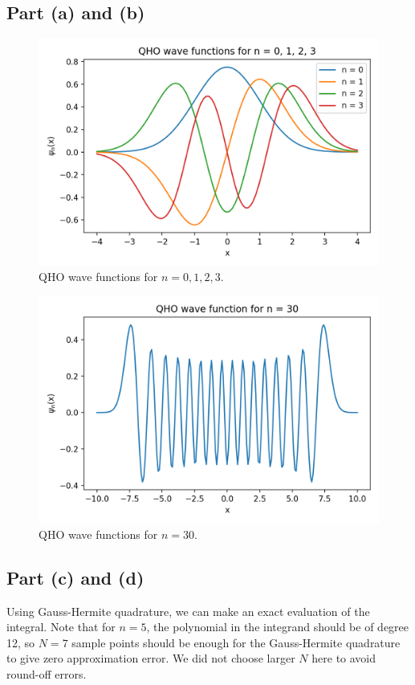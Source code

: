 \documentclass[11pt]{article}
\begin{document}
\subsection{Part (a) and (b)}
\begin{figure}[H]
    \centering
    \includegraphics[scale = 1.0]{images/ps-4-3a.png}
    \caption{QHO wave functions for $n = 0, 1, 2, 3$.}
    \label{fig:QHO0123}
\end{figure}
\begin{figure}[H]
    \centering
    \includegraphics[scale = 1.0]{images/ps-4-3b.png}
    \caption{QHO wave functions for $n = 30$.}
    \label{fig:QHO30}
\end{figure}

\subsection{Part (c) and (d)}
Using Gauss-Hermite quadrature, we can make an exact evaluation of the integral. Note that for $n = 5$, the polynomial in the integrand should be of degree 12, so $N = 7$ sample points should be enough for the Gauss-Hermite quadrature to give zero approximation error. We did not choose larger $N$ here to avoid round-off errors.

\end{document}
